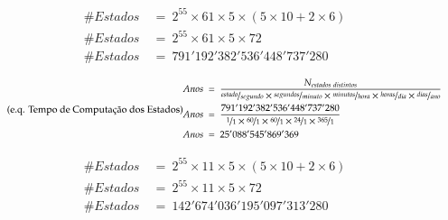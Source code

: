 \documentclass[dvipdfm, a4paper, 11pt]{article}
\begin{document}
\begin{equation} \label{eq_estados} \tag{e.q. Caso Geral}
\begin{split}
\#Estados\ &=\ 2^{55}\times 61\times 5\times (5\times 10 + 2\times 6)\\
\#Estados\ &=\ 2^{55}\times 61\times 5\times 72\\
\#Estados\ &=\ 791'192'382'536'448'737'280
\end{split}
\end{equation}

\begin{equation} \label{eq_anos_estados} \tag{e.q. Tempo de Computação dos Estados}
\begin{split}
Anos\ &=\ \dfrac{N_{estados\ distintos}}{\nicefrac{estado}{segundo}\times\nicefrac{segundos}{minuto}\times\nicefrac{minutos}{hora}\times\nicefrac{horas}{dia}\times\nicefrac{dias}{ano}}\\
Anos\ &=\ \dfrac{791'192'382'536'448'737'280}{\nicefrac{1}{1}\times\nicefrac{60}{1}\times\nicefrac{60}{1}\times\nicefrac{24}{1}\times\nicefrac{365}{1}}\\
Anos\ &=\ 25'088'545'869'369\\
\end{split}
\end{equation}

\begin{equation} \label{eq_poda1} \tag{e.q. Poda 1}
\begin{split}
\#Estados\ &=\ 2^{55}\times 11\times 5\times (5\times 10 + 2\times 6)\\
\#Estados\ &=\ 2^{55}\times 11\times 5\times 72\\
\#Estados\ &=\ 142'674'036'195'097'313'280
\end{split}
\end{equation}
\end{document}
